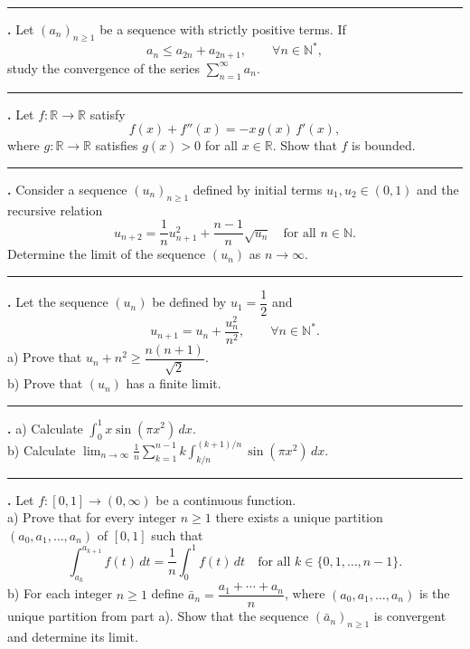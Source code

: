 \documentclass[11pt]{article}
\newcounter{probnum}
\newenvironment{problembox}{\par\noindent\rule{\linewidth}{0.5pt}\vspace{5pt}\par}{\vspace{2pt}}
\begin{document}
\begin{problembox}
\textbf{\theprobnum.} Let $(a_n)_{n \ge 1}$ be a sequence with strictly positive terms. If
\[
a_n \le a_{2n} + a_{2n+1}, \qquad \forall n \in \mathbb{N}^*,
\]
study the convergence of the series $\displaystyle\sum_{n=1}^{\infty} a_n$.
\end{problembox}

\begin{problembox}
\textbf{\theprobnum.} Let $f : \mathbb{R} \to \mathbb{R}$ satisfy
\[
f(x) + f''(x) = -x\, g(x)\, f'(x),
\]
where $g : \mathbb{R} \to \mathbb{R}$ satisfies $g(x) > 0$ for all $x \in \mathbb{R}$. Show that $f$ is bounded.
\end{problembox}

\begin{problembox}
\textbf{\theprobnum.} Consider a sequence $(u_n)_{n \ge 1}$ defined by initial terms $u_1, u_2 \in (0,1)$ and the recursive relation
\[
u_{n+2} = \frac{1}{n} u_{n+1}^2 + \frac{n-1}{n} \sqrt{u_n} \quad \text{for all } n \in \mathbb{N}.
\]
Determine the limit of the sequence $(u_n)$ as $n \to \infty$.
\end{problembox}

\begin{problembox}
\textbf{\theprobnum.} Let the sequence $(u_n)$ be defined by $u_1 = \dfrac{1}{2}$ and
\[
u_{n+1} = u_n + \frac{u_n^2}{n^2}, \qquad \forall n \in \mathbb{N}^*.
\]
a) Prove that $u_n + n^2 \ge \dfrac{n(n+1)}{\sqrt{2}}$.\\
b) Prove that $(u_n)$ has a finite limit.
\end{problembox}

\begin{problembox}
\textbf{\theprobnum.} a) Calculate $\displaystyle\int_0^1 x \sin(\pi x^2)\,dx$.\\
b) Calculate $\displaystyle\lim_{n \to \infty} \frac{1}{n} \sum_{k=1}^{n-1} k \int_{k/n}^{(k+1)/n} \sin(\pi x^2)\,dx$.
\end{problembox}

\begin{problembox}
\textbf{\theprobnum.} Let $f : [0,1] \to (0,\infty)$ be a continuous function.\\
a) Prove that for every integer $n \ge 1$ there exists a unique partition $(a_0, a_1, \ldots, a_n)$ of $[0,1]$ such that
\[
\int_{a_k}^{a_{k+1}} f(t)\,dt = \frac{1}{n} \int_0^1 f(t)\,dt \quad \text{for all } k \in \{0,1,\ldots,n-1\}.
\]
b) For each integer $n \ge 1$ define $\bar{a}_n = \dfrac{a_1 + \cdots + a_n}{n}$, where $(a_0,a_1,\ldots,a_n)$ is the unique partition from part a). Show that the sequence $(\bar{a}_n)_{n \ge 1}$ is convergent and determine its limit.
\end{problembox}
\end{document}
